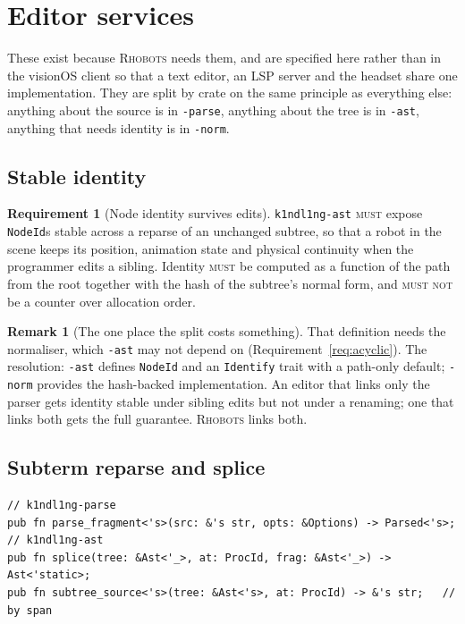 \documentclass[11pt,a4paper]{article}
\newcommand{\code}[1]{\texttt{#1}}
\newcommand{\Rhobots}{\textsc{Rhobots}}
\newcommand{\MUST}{\textsc{must}}
\newcommand{\MUSTNOT}{\textsc{must not}}
\theoremstyle{definition}
\newtheorem{requirement}[definition]{Requirement}
\newtheorem{remark}[definition]{Remark}
\theoremstyle{plain}
\begin{document}
\section{Editor services}\label{sec:editor}

These exist because \Rhobots{} needs them, and are specified here rather than in
the visionOS client so that a text editor, an LSP server and the headset share
one implementation. They are split by crate on the same principle as everything
else: anything about the source is in \code{-parse}, anything about the tree is
in \code{-ast}, anything that needs identity is in \code{-norm}.

\subsection{Stable identity}

\begin{requirement}[Node identity survives edits]\label{req:ids}
\code{k1ndl1ng-ast} \MUST{} expose \code{NodeId}s stable across a reparse of an
unchanged subtree, so that a robot in the scene keeps its position, animation
state and physical continuity when the programmer edits a sibling. Identity
\MUST{} be computed as a function of the path from the root together with the
hash of the subtree's normal form, and \MUSTNOT{} be a counter over allocation
order.
\end{requirement}

\begin{remark}[The one place the split costs something]
That definition needs the normaliser, which \code{-ast} may not depend on
(Requirement~\ref{req:acyclic}). The resolution: \code{-ast} defines
\code{NodeId} and an \code{Identify} trait with a path-only default;
\code{-norm} provides the hash-backed implementation. An editor that links only
the parser gets identity stable under sibling edits but not under a renaming;
one that links both gets the full guarantee. \Rhobots{} links both.
\end{remark}

\subsection{Subterm reparse and splice}

\begin{lstlisting}
// k1ndl1ng-parse
pub fn parse_fragment<'s>(src: &'s str, opts: &Options) -> Parsed<'s>;
// k1ndl1ng-ast
pub fn splice(tree: &Ast<'_>, at: ProcId, frag: &Ast<'_>) -> Ast<'static>;
pub fn subtree_source<'s>(tree: &Ast<'s>, at: ProcId) -> &'s str;   // by span
\end{lstlisting}
\end{document}
